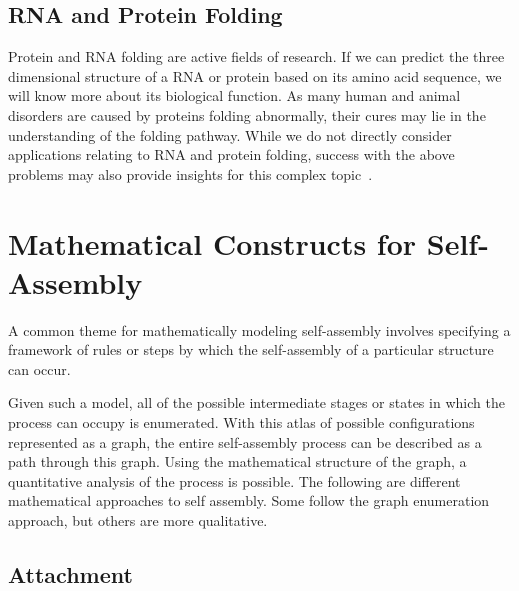 \subsection{RNA and Protein Folding}

Protein and RNA folding are active fields of research. If we can predict the three dimensional structure of a RNA or protein based on its amino acid sequence, we will know more about its biological function. As many human and animal disorders are caused by proteins folding abnormally, their cures may lie in the understanding of the folding pathway. While we do not directly consider applications relating to RNA and protein folding, success with the above problems may also provide insights for this complex topic~\cite{Lindorff-Larsen2011}.


\section{Mathematical Constructs for Self-Assembly}

A common theme for mathematically modeling self-assembly involves specifying a framework of rules or steps by which the self-assembly of a particular structure can occur.

 Given such a model, all of the possible intermediate stages or states in which the process can occupy is enumerated. With this atlas of possible configurations represented as a graph, the entire self-assembly process can be described as a path through this graph. Using the mathematical structure of the graph, a quantitative analysis of the process is possible. The following are different mathematical approaches to self assembly. Some follow the graph enumeration approach, but others are more qualitative. 


\subsection{Attachment}

